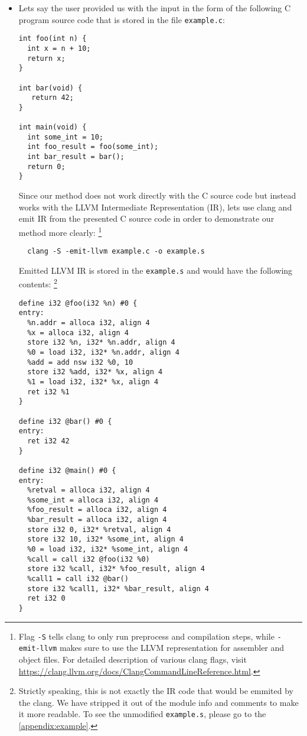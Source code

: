 \documentclass[12pt, twoside]{fithesis2}
\renewcommand{\_}{\leavevmode \kern0.07em\vbox{\hrule width0.4em}}
\newcommand{\squarebullet}{\textcolor{black}{\raisebox{0.15em}{\rule{4pt}{4pt}}}}
\newenvironment{myItemize}{
  \begin{itemize}[
    leftmargin=2em,
    rightmargin=1em,
    itemsep=\parskip,
    parsep=0em,
    topsep=0em,
    partopsep=0em
]
  \renewcommand{\labelitemi}{\squarebullet}
  \renewcommand{\labelitemii}{\textbullet}
}{
  \end{itemize}
}
\begin{document}
\begin{myItemize}
\item Lets say the user provided us with the input in the form of the following
C program source code that is stored in the file \texttt{example.c}:

\begin{verbatim}
int foo(int n) {
  int x = n + 10;
  return x;
}

int bar(void) {
   return 42;
}

int main(void) {
  int some_int = 10;
  int foo_result = foo(some_int);
  int bar_result = bar();
  return 0;
}
\end{verbatim}


Since our method does not work directly with the C source code but instead
works with the LLVM Intermediate Representation (IR), lets use clang and emit
IR from the presented C source code in order to demonstrate our method more
clearly:
\footnote{
Flag \texttt{-S} tells clang to only run preprocess and
compilation steps, while \texttt{-emit-llvm} makes sure to use the LLVM
representation for assembler and object files. For detailed description of
various clang flags, visit
\url{https://clang.llvm.org/docs/ClangCommandLineReference.html}.
}

\begin{verbatim}
  clang -S -emit-llvm example.c -o example.s
\end{verbatim}

Emitted LLVM IR is stored in the \texttt{example.s} and would
have the following contents:
\footnote
{
Strictly speaking, this is not exactly the IR code that would be emmited by the
clang. We have stripped it out of the module info and comments to make it more
readable. To see the unmodified \texttt{example.s}, please go to the
\autoref{appendix:example}.
}

\begin{verbatim}
define i32 @foo(i32 %n) #0 {
entry:
  %n.addr = alloca i32, align 4
  %x = alloca i32, align 4
  store i32 %n, i32* %n.addr, align 4
  %0 = load i32, i32* %n.addr, align 4
  %add = add nsw i32 %0, 10
  store i32 %add, i32* %x, align 4
  %1 = load i32, i32* %x, align 4
  ret i32 %1
}

define i32 @bar() #0 {
entry:
  ret i32 42
}

define i32 @main() #0 {
entry:
  %retval = alloca i32, align 4
  %some_int = alloca i32, align 4
  %foo_result = alloca i32, align 4
  %bar_result = alloca i32, align 4
  store i32 0, i32* %retval, align 4
  store i32 10, i32* %some_int, align 4
  %0 = load i32, i32* %some_int, align 4
  %call = call i32 @foo(i32 %0)
  store i32 %call, i32* %foo_result, align 4
  %call1 = call i32 @bar()
  store i32 %call1, i32* %bar_result, align 4
  ret i32 0
}
\end{verbatim}
\end{myItemize}
\end{document}
